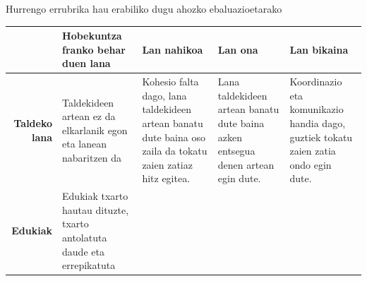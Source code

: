 \documentclass[
]{book}
\begin{document}
Hurrengo errubrika hau erabiliko dugu ahozko ebaluazioetarako

\begin{longtable}[]{@{}rllll@{}}
\toprule
\begin{minipage}[b]{0.11\columnwidth}\raggedleft
\strut
\end{minipage} & \begin{minipage}[b]{0.19\columnwidth}\raggedright
\textbf{Hobekuntza franko behar duen lana}\strut
\end{minipage} & \begin{minipage}[b]{0.19\columnwidth}\raggedright
\textbf{Lan nahikoa}\strut
\end{minipage} & \begin{minipage}[b]{0.19\columnwidth}\raggedright
\textbf{Lan ona}\strut
\end{minipage} & \begin{minipage}[b]{0.19\columnwidth}\raggedright
\textbf{Lan bikaina}\strut
\end{minipage}\tabularnewline
\midrule
\endhead
\begin{minipage}[t]{0.11\columnwidth}\raggedleft
\textbf{Taldeko lana}\strut
\end{minipage} & \begin{minipage}[t]{0.19\columnwidth}\raggedright
Taldekideen artean ez da elkarlanik egon eta lanean nabaritzen da\strut
\end{minipage} & \begin{minipage}[t]{0.19\columnwidth}\raggedright
Kohesio falta dago, lana taldekideen artean banatu dute baina oso zaila da tokatu zaien zatiaz hitz egitea.\strut
\end{minipage} & \begin{minipage}[t]{0.19\columnwidth}\raggedright
Lana taldekideen artean banatu dute baina azken entsegua denen artean egin dute.\strut
\end{minipage} & \begin{minipage}[t]{0.19\columnwidth}\raggedright
Koordinazio eta komunikazio handia dago, guztiek tokatu zaien zatia ondo egin dute.\strut
\end{minipage}\tabularnewline
\begin{minipage}[t]{0.11\columnwidth}\raggedleft
\textbf{Edukiak}\strut
\end{minipage} & \begin{minipage}[t]{0.19\columnwidth}\raggedright
Edukiak txarto hautau dituzte, txarto antolatuta daude eta errepikatuta\strut
\end{minipage} & \begin{minipage}[t]{0.19\columnwidth}\raggedright

\end{minipage}
\end{longtable}
\end{document}

